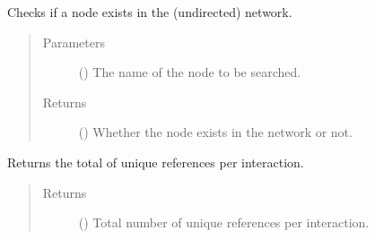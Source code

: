 \documentclass[letterpaper,10pt,english]{sphinxmanual}
\begin{document}
\begin{fulllineitems}
\begin{fulllineitems}
\label{\detokenize{reference:pypath.main.PyPath.node_exists}}
Checks if a node exists in the (undirected) network.
\begin{quote}\begin{description}
\item[{Parameters}] \leavevmode
{} () \textendash{} The name of the node to be searched.

\item[{Returns}] \leavevmode
() \textendash{} Whether the node exists in the network or not.

\end{description}\end{quote}

\end{fulllineitems}


\begin{fulllineitems}
\label{\detokenize{reference:pypath.main.PyPath.numof_directed_edges}}
\end{fulllineitems}


\begin{fulllineitems}
\label{\detokenize{reference:pypath.main.PyPath.numof_reference_interaction_pairs}}
Returns the total of unique references per interaction.
\begin{quote}\begin{description}
\item[{Returns}] \leavevmode
() \textendash{} Total number of unique references per
interaction.

\end{description}\end{quote}

\end{fulllineitems}


\end{fulllineitems}
\end{document}
